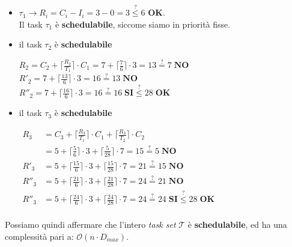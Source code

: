 \begin{itemize}
    \item $\tau_1 \rightarrow R_i = C_i - I_i = 3 - 0 = 3 \stackrel{\text{?}}{\leq} 6$ \textbf{OK}. \\
    Il task $\tau_1$ è \textbf{schedulabile}, siccome siamo in priorità fisse.
    \item il task $\tau_2$ è \textbf{schedulabile}
    \begin{center}
        $R_2 = C_2 + \lceil \frac{R_2}{T_1} \rceil \cdot C_1 = 7 + \lceil \frac{7}{6} \rceil \cdot 3 = 13 \stackrel{\text{?}}{=} 7 \; \mathbf{NO}$ \\
        $R'_2 = 7 + \lceil \frac{13}{6} \rceil \cdot 3 = 16 \stackrel{\text{?}}{=} 13 \; \mathbf{NO}$ \\
        $R''_2 = 7 + \lceil \frac{16}{6} \rceil \cdot 3 = 16 \stackrel{\text{?}}{=} 16 \; \mathbf{SI} \stackrel{\text{?}}{\leq} 28 \; \mathbf{OK}$ 
    \end{center}
    \item il task $\tau_3$ è \textbf{schedulabile}
    \begin{center}
        \begin{math}
            \begin{aligned}
                R_3 &= C_3 +  \lceil \frac{R_3}{T_1} \rceil \cdot C_1  + \lceil \frac{R_3}{T_2} \rceil \cdot C_2 \\
                &= 5 +  \lceil \frac{5}{6} \rceil \cdot 3  + \lceil \frac{5}{28} \rceil \cdot 7 = 15 \stackrel{\text{?}}{=} 5 \; \mathbf{NO} \\
                R'_3 &= 5 +  \lceil \frac{15}{6} \rceil \cdot 3  + \lceil \frac{15}{28} \rceil \cdot 7 = 21 \stackrel{\text{?}}{=} 15 \; \mathbf{NO} \\
                R''_3 &= 5 +  \lceil \frac{21}{6} \rceil \cdot 3  + \lceil \frac{21}{28} \rceil \cdot 7 = 24 \stackrel{\text{?}}{=} 21 \; \mathbf{NO} \\
                R''_3 &= 5 +  \lceil \frac{24}{6} \rceil \cdot 3  + \lceil \frac{24}{28} \rceil \cdot 7 = 24 \stackrel{\text{?}}{=} 24 \; \mathbf{SI} \stackrel{\text{?}}{\leq} 28 \; \mathbf{OK}\\
            \end{aligned}
        \end{math}
    \end{center}
\end{itemize}
Possiamo quindi affermare che l'intero \textit{task set} $\mathcal{T}$ è \textbf{schedulabile}, ed ha una complessità pari a: $\mathcal{O}(n \cdot D_{max})$.
\newpage
